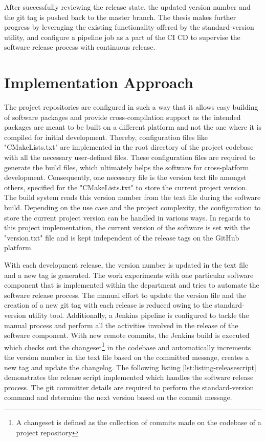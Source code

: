 After successfully reviewing the release state, the updated version number and the git tag is pushed back to the master branch. The thesis makes further progress by leveraging the existing functionality offered by the standard-version utility, and configure a pipeline job as a part of the \ac{CI} \ac{CD} to supervise the software release process with continuous release.

\section{Implementation Approach}\label{section:implementationconcept}

The project repositories are configured in such a way that it allows easy building of software packages and provide cross-compilation support as the intended packages are meant to be built on a different platform and not the one where it is compiled for initial development. Thereby, configuration files like "CMakeLists.txt" are implemented in the root directory of the project codebase with all the necessary user-defined files. These configuration files are required to generate the build files, which ultimately helps the software for cross-platform development. Consequently, one necessary file is the version text file amongst others, specified for the "CMakeLists.txt" to store the current project version. The build system reads this version number from the text file during the software build. Depending on the use case and the project complexity, the configuration to store the current project version can be handled in various ways. In regards to this project implementation, the current version of the software is set with the "version.txt" file and is kept independent of the release tags on the GitHub platform.

With each development release, the version number is updated in the text file and a new tag is generated. The work experiments with one particular software component that is implemented within the department and tries to automate the software release process. The manual effort to update the version file and the creation of a new git tag with each release is reduced owing to the standard-version utility tool. Additionally, a Jenkins pipeline is configured to tackle the manual process and perform all the activities involved in the release of the software component. With new remote commits, the Jenkins build is executed which checks out the changeset\footnote{A changeset is defined as the collection of commits made on the codebase of a project repository} in the codebase and automatically increments the version number in the text file based on the committed message, creates a new tag and update the changelog. The following listing \ref{lst:listing-releasescript} demonstrates the release script implemented which handles the software release process. The git committer details are required to perform the standard-version command and determine the next version based on the commit message. 

